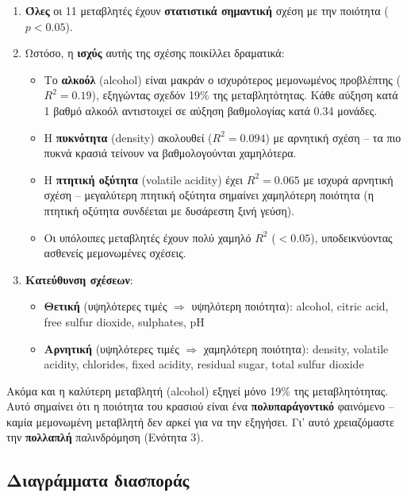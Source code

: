 \documentclass[12pt,a4paper]{article}
\begin{document}
\begin{enumerate}
    \item \textbf{Όλες} οι 11 μεταβλητές έχουν \textbf{στατιστικά σημαντική} σχέση με την ποιότητα ($p < 0.05$).

    \item Ωστόσο, η \textbf{ισχύς} αυτής της σχέσης ποικίλλει δραματικά:
    \begin{itemize}
        \item Το \textbf{αλκοόλ} (alcohol) είναι μακράν ο ισχυρότερος μεμονωμένος προβλέπτης ($R^2 = 0.19$), εξηγώντας σχεδόν 19\% της μεταβλητότητας. Κάθε αύξηση κατά 1 βαθμό αλκοόλ αντιστοιχεί σε αύξηση βαθμολογίας κατά 0.34 μονάδες.
        \item Η \textbf{πυκνότητα} (density) ακολουθεί ($R^2 = 0.094$) με αρνητική σχέση -- τα πιο πυκνά κρασιά τείνουν να βαθμολογούνται χαμηλότερα.
        \item Η \textbf{πτητική οξύτητα} (volatile acidity) έχει $R^2 = 0.065$ με ισχυρά αρνητική σχέση -- μεγαλύτερη πτητική οξύτητα σημαίνει χαμηλότερη ποιότητα (η πτητική οξύτητα συνδέεται με δυσάρεστη ξινή γεύση).
        \item Οι υπόλοιπες μεταβλητές έχουν πολύ χαμηλό $R^2$ ($< 0.05$), υποδεικνύοντας ασθενείς μεμονωμένες σχέσεις.
    \end{itemize}

    \item \textbf{Κατεύθυνση σχέσεων}:
    \begin{itemize}
        \item \textbf{Θετική} (υψηλότερες τιμές $\Rightarrow$ υψηλότερη ποιότητα): alcohol, citric acid, free sulfur dioxide, sulphates, pH
        \item \textbf{Αρνητική} (υψηλότερες τιμές $\Rightarrow$ χαμηλότερη ποιότητα): density, volatile acidity, chlorides, fixed acidity, residual sugar, total sulfur dioxide
    \end{itemize}
\end{enumerate}

\begin{importantbox}
Ακόμα και η καλύτερη μεταβλητή (alcohol) εξηγεί μόνο 19\% της μεταβλητότητας. Αυτό σημαίνει ότι η ποιότητα του κρασιού είναι ένα \textbf{πολυπαράγοντικό} φαινόμενο -- καμία μεμονωμένη μεταβλητή δεν αρκεί για να την εξηγήσει. Γι' αυτό χρειαζόμαστε την \textbf{πολλαπλή} παλινδρόμηση (Ενότητα 3).
\end{importantbox}

\subsection{Διαγράμματα διασποράς}
\end{document}
